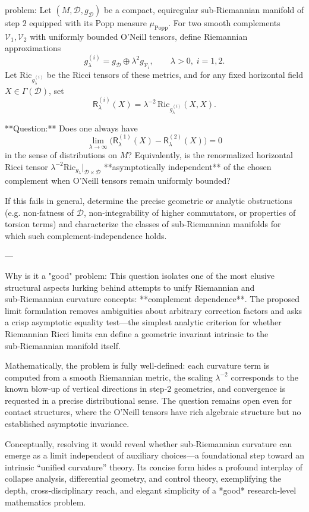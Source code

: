 problem:  
Let \((M,\mathcal{D},g_{\mathcal{D}})\) be a compact, equiregular sub‑Riemannian manifold of step \(2\) equipped with its Popp measure \(\mu_{\mathrm{Popp}}\).  
For two smooth complements \(\mathcal{V}_1,\mathcal{V}_2\) with uniformly bounded O’Neill tensors, define Riemannian approximations  
\[
g_\lambda^{(i)} = g_{\mathcal{D}}\oplus \lambda^2 g_{\mathcal{V}_i},\qquad \lambda>0,\; i=1,2.
\]
Let \(\mathrm{Ric}_{g_\lambda^{(i)}}\) be the Ricci tensors of these metrics, and for any fixed horizontal field \(X\in\Gamma(\mathcal{D})\), set
\[
\mathsf{R}_\lambda^{(i)}(X)=\lambda^{-2}\,\mathrm{Ric}_{g_\lambda^{(i)}}(X,X).
\]

**Question:**  
Does one always have
\[
\lim_{\lambda\to\infty}
\big(
\mathsf{R}_\lambda^{(1)}(X)
-
\mathsf{R}_\lambda^{(2)}(X)
\big)
=0
\]
in the sense of distributions on \(M\)?
Equivalently, is the renormalized horizontal Ricci tensor \(\lambda^{-2}\mathrm{Ric}_{g_\lambda}\big|_{\mathcal{D}\times\mathcal{D}}\) **asymptotically independent** of the chosen complement when O’Neill tensors remain uniformly bounded?

If this fails in general, determine the precise geometric or analytic obstructions (e.g. non‑fatness of \(\mathcal{D}\), non‑integrability of higher commutators, or properties of torsion terms) and characterize the classes of sub‑Riemannian manifolds for which such complement‑independence holds.

---

Why is it a "good" problem:  
This question isolates one of the most elusive structural aspects lurking behind attempts to unify Riemannian and sub‑Riemannian curvature concepts: **complement dependence**. The proposed limit formulation removes ambiguities about arbitrary correction factors and asks a crisp asymptotic equality test—the simplest analytic criterion for whether Riemannian Ricci limits can define a geometric invariant intrinsic to the sub‑Riemannian manifold itself.  

Mathematically, the problem is fully well‑defined: each curvature term is computed from a smooth Riemannian metric, the scaling \(\lambda^{-2}\) corresponds to the known blow‑up of vertical directions in step‑2 geometries, and convergence is requested in a precise distributional sense. The question remains open even for contact structures, where the O’Neill tensors have rich algebraic structure but no established asymptotic invariance.  

Conceptually, resolving it would reveal whether sub‑Riemannian curvature can emerge as a limit independent of auxiliary choices—a foundational step toward an intrinsic “unified curvature” theory. Its concise form hides a profound interplay of collapse analysis, differential geometry, and control theory, exemplifying the depth, cross‑disciplinary reach, and elegant simplicity of a *good* research‑level mathematics problem.